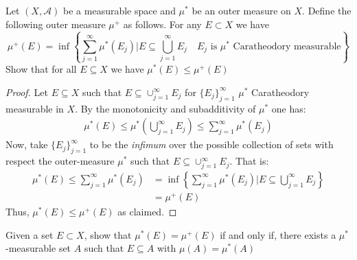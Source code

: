 \documentclass[nocolor]{report}
\begin{document}
\newpage
\begin{ex}[Question 2a] 
Let $(X,\mathcal{A})$ be a measurable space and $\mu^*$ be an outer measure on $X$. Define the following outer measure $\mu^+$ as follows. For any $E\subset X$ we have 
$$\mu^+(E) = \inf\left\{ \sum_{j=1}^{\infty}\mu^*(E_j)  \big| E\subseteq\bigcup_{j=1}^{\infty}E_j \quad E_j \text{ is $\mu^*$ Caratheodory measurable}\right\}$$
Show that for all $E\subseteq X$ we have $\mu^*(E)\leq\mu^+(E)$
\end{ex}
\begin{proof}
    Let $E\subseteq X$ such that $E\subseteq \cup_{j=1}^{\infty} E_j$ for $\{E_j\}_{j=1}^{\infty}$ $\mu^*$ Caratheodory measurable in $X$. By the monotonicity and subadditivity of $\mu^*$ one has: 
    \begin{align*}
        \mu^*(E) \leq \mu^*\left( \bigcup_{j=1}^{\infty} E_j\right) \leq \sum_{j=1}^{\infty}\mu^*(E_j)
    \end{align*}
    Now, take $\{E_j\}_{j=1}^{\infty}$ to be the \textit{infimum} over the possible collection of sets with respect the outer-measure $\mu^*$ such that $E\subseteq \cup_{j=1}^{\infty} E_j$. That is: 
    \begin{align*}
         \mu^*(E) \leq \sum_{j=1}^{\infty}\mu^*(E_j) &= \inf\left\{ \sum_{j=1}^{\infty}\mu^*(E_j) \big | E\subseteq\bigcup_{j=1}^{\infty} E_j\right\} \\
         &= \mu^+(E)
    \end{align*}
    Thus, $\mu^*(E)\leq\mu^+(E)$ as claimed. 
\end{proof}
\begin{ex}[Question 2b] 
    Given a set $E\subset X$, show that $\mu^*(E) = \mu^+(E)$ if and only if, there exists a $\mu^*$-measurable set $A$ such that $E\subseteq A$ with $\mu(A) = \mu^*(A)$
\end{ex}
\end{document}
